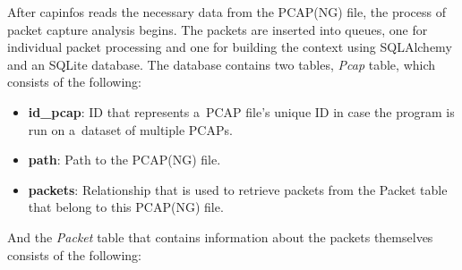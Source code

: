 \documentclass[
  printed,     %
  color,       %
  oneside,     %
  nosansbold,  %
  nocolorbold, %
  nolof,         %
  nolot,         %
]{fithesis4}
\begin{document}
After capinfos reads the necessary data from the PCAP(NG) file, the process of packet capture analysis begins. The packets are inserted into queues, one for individual packet processing and one for building the context using SQLAlchemy and an SQLite database. The database contains two tables, \textit{Pcap} table, which consists of the following:

\begin{itemize}[noitemsep,topsep=0pt]
    \item \textbf{id\_pcap}: ID that represents a~PCAP file's unique ID in case the program is run on a~dataset of multiple PCAPs.
    \item \textbf{path}: Path to the PCAP(NG) file.
    \item \textbf{packets}: Relationship that is used to retrieve packets from the Packet table that belong to this PCAP(NG) file.
\end{itemize}

And the \textit{Packet} table that contains information about the packets themselves consists of the following:
\end{document}
